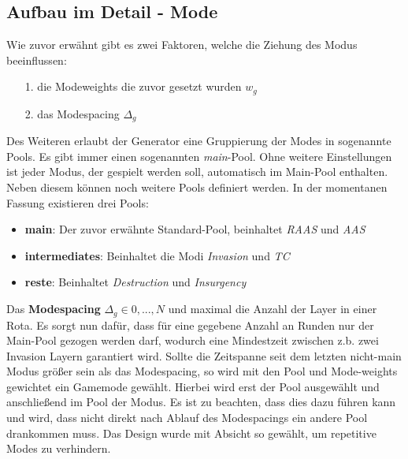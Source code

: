     \subsection{Aufbau im Detail - Mode}
        Wie zuvor erwähnt gibt es zwei Faktoren, welche die Ziehung des Modus beeinflussen:
        \begin{itemize}
            \item [1.] die Modeweights die zuvor gesetzt wurden $w_g$
            \item [2.] das Modespacing $\Delta_g$
        \end{itemize}
        Des Weiteren erlaubt der Generator eine Gruppierung der Modes in sogenannte \glqq{}Pools\grqq{}.
        Es gibt immer einen sogenannten \textit{main}-Pool.
        Ohne weitere Einstellungen ist jeder Modus, der gespielt werden soll, automatisch im Main-Pool enthalten.
        Neben diesem können noch weitere Pools definiert werden.
        In der momentanen Fassung existieren drei Pools:
        \begin{itemize}
            \item \textbf{main}: Der zuvor erwähnte Standard-Pool, beinhaltet \textit{RAAS} und \textit{AAS}
            \item \textbf{intermediates}: Beinhaltet die Modi \textit{Invasion} und \textit{TC}
            \item \textbf{reste}: Beinhaltet \textit{Destruction} und \textit{Insurgency}
        \end{itemize}

        Das \textbf{Modespacing} $\Delta_g\in{0,...,N}$ und maximal die Anzahl der Layer in einer Rota.
        Es sorgt nun dafür, dass für eine gegebene Anzahl an Runden nur der Main-Pool gezogen werden darf, wodurch eine \glqq{}Mindestzeit\grqq{} zwischen z.b. zwei Invasion Layern garantiert wird.
        Sollte die Zeitspanne seit dem letzten nicht-main Modus größer sein als das Modespacing, so wird mit den Pool und Mode-weights gewichtet ein Gamemode gewählt.
        Hierbei wird erst der Pool ausgewählt und anschließend im Pool der Modus.
        Es ist zu beachten, dass dies dazu führen kann und wird, dass nicht direkt nach Ablauf des Modespacings ein andere Pool drankommen muss.
        Das Design wurde mit Absicht so gewählt, um repetitive Modes zu verhindern.


